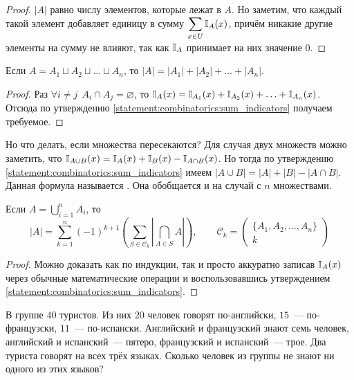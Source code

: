 \begin{proof}
    $ |A| $ равно числу элементов, которые лежат в $ A $.
    Но заметим, что каждый такой элемент добавляет единицу в сумму $ \displaystyle \sum_{x \in U} \mathbb{I}_A(x) $,
    причём никакие другие элементы на сумму не влияют, так как $ \mathbb{I}_A $ принимает на них значение $ 0 $.
\end{proof}

\begin{corollary}
    Если $ A = A_1 \sqcup A_2 \sqcup \ldots \sqcup A_n $, то $ |A| = |A_1| + |A_2| + \ldots + |A_n| $.
\end{corollary}

\begin{proof}
    Раз $ \forall i \neq j \;\, A_i \cap A_j = \varnothing $, то $ \mathbb{I}_A(x) = \mathbb{I}_{A_1}(x) + \mathbb{I}_{A_2}(x) + \ldots + \mathbb{I}_{A_n}(x) $.
    Отсюда по утверждению \ref{statement:combinatorics:sum_indicators} получаем требуемое.
\end{proof}

Но что делать, если множества пересекаются?
Для случая двух множеств можно заметить, что $ \mathbb{I}_{A \cup B}(x) = \mathbb{I}_A(x) + \mathbb{I}_B(x) - \mathbb{I}_{A \cap B}(x) $.
Но тогда по утверждению \ref{statement:combinatorics:sum_indicators} имеем $ |A \cup B| = |A| + |B| - |A \cap B| $.
Данная формула называется .
Она обобщается и на случай с $ n $ множествами.

\begin{lemma}
    Если $ \displaystyle A = \bigcup_{i=1}^n A_i $, то
    \[
        |A| = \sum_{k=1}^n (-1)^{k+1} \left( \sum_{S \in \mathcal{C}_k} \left| \bigcap_{A \in S} A \right| \right), \qquad
        \mathcal{C}_k = \begin{pmatrix} \{ A_1, A_2, \ldots, A_n \} \\ k \end{pmatrix}
    \]
\end{lemma}

\begin{proof}
    Можно доказать как по индукции, так и просто аккуратно записав $ \mathbb{I}_A(x) $ через обычные математические операции
    и воспользовавшись утверждением \ref{statement:combinatorics:sum_indicators}.
\end{proof}

\begin{Exercise}[counter=SecExercise]
    \noindent
    В группе $ 40 $ туристов.
    Из них $ 20 $ человек говорят по-английски, $ 15 $~--- по-французски, $ 11 $~--- по-испански.
    Английский и французский знают семь человек, английский и испанский~--- пятеро, французский и испанский~--- трое.
    Два туриста говорят на всех трёх языках.
    Сколько человек из группы не знают ни одного из этих языков?
\end{Exercise}

